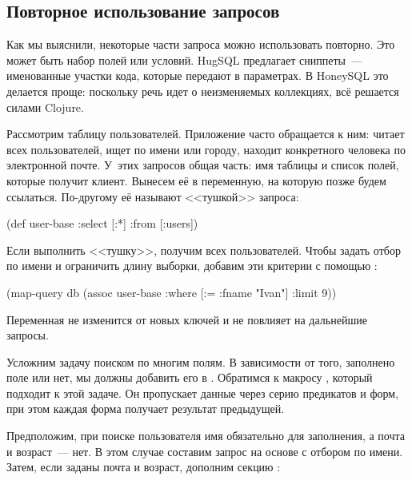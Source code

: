 \subsection{Повторное использование запросов}

Как мы выяснили, некоторые части запроса можно использовать повторно. Это может быть набор полей или условий. HugSQL предлагает сниппеты~--- именованные участки кода, которые передают в параметрах. В HoneySQL это делается проще: поскольку речь идет о неизменяемых коллекциях, всё решается силами Clojure.

Рассмотрим таблицу пользователей. Приложение часто обращается к ним: читает всех пользователей, ищет по имени или городу, находит конкретного человека по электронной почте. У~этих запросов общая часть: имя таблицы и список полей, которые получит клиент. Вынесем её в переменную, на которую позже будем ссылаться. По-другому её называют <<тушкой>> запроса:

\begin{english}
  \begin{clojure}
(def user-base
  {:select [:*]
   :from [:users]})
  \end{clojure}
\end{english}

Если выполнить <<тушку>>, получим всех пользователей. Чтобы задать отбор по имени и ограничить длину выборки, добавим эти критерии с помощью :

\begin{english}
  \begin{clojure}
(map-query db
           (assoc user-base
                  :where [:= :fname "Ivan"]
                  :limit 9))
  \end{clojure}
\end{english}

Переменная  не изменится от новых ключей и не повлияет на дальнейшие запросы.


Усложним задачу поиском по многим полям. В зависимости от того, заполнено поле или нет, мы должны добавить его в . Обратимся к макросу , который подходит к этой задаче. Он пропускает данные через серию предикатов и форм, при этом каждая форма получает результат предыдущей.

Предположим, при поиске пользователя имя обязательно для заполнения, а почта и возраст~--- нет. В этом случае составим запрос на основе  с отбором по имени. Затем, если заданы почта и возраст, дополним секцию :


